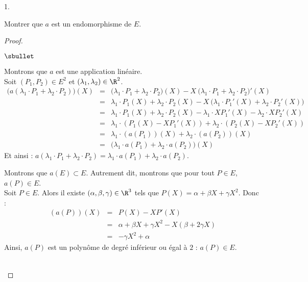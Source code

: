 \begin{noliste}{1.}
  \setlength{\itemsep}{2mm}
\item Montrer que $a$ est un endomorphisme de $E$.
  
  \begin{proof}~
    \begin{noliste}{$\sbullet$}
    \item Montrons que $a$ est une application linéaire.\\
      Soit $(P_1,P_2)\in E^2$ et $(\lambda_1,\lambda_2)\in\R^2$.
      \[
      \begin{array}{rcl}
        \big(a(\lambda_1 \cdot P_1+ \lambda_2 \cdot P_2)\big)(X) & =
        & \big(\lambda_1 \cdot P_1+\lambda_2 \cdot P_2\big)(X) -
        X \ \big(\lambda_1 \cdot P_1+\lambda_2 \cdot P_2 \big)'(X)
        \\[.2cm]
        & = & \lambda_1 \cdot P_1(X) + \lambda_2 \cdot P_2(X)
        -X \ \big(\lambda_1 \cdot P_1'(X) + \lambda_2 \cdot P_2'(X)\big)
        \\[.2cm] 
        & = & \lambda_1 \cdot P_1(X)+\lambda_2 \cdot P_2(X)-\lambda_1 \cdot 
        XP_1'(X) - \lambda_2 \cdot X 
        P_2'(X)
        \\[.2cm]
        & = & \lambda_1 \cdot (P_1(X)-XP_1'(X))+\lambda_2 \cdot(P_2(X)-XP_2'(X))
        \\[.2cm]
        & = & \lambda_1 \cdot (a(P_1))(X)+ \lambda_2 \cdot (a(P_2))(X)
        \\[.2cm]
        & = & \big(\lambda_1 \cdot a(P_1)+ \lambda_2 \cdot a(P_2) \big)(X)
      \end{array}
      \]
      Et ainsi : $a(\lambda_1 \cdot P_1+ \lambda_2 \cdot P_2) =
      \lambda_1 \cdot a(P_1)+ \lambda_2 \cdot a(P_2)$.
      
    \item Montrons que $a(E)\subset E$. Autrement dit, montrons que
      pour
      tout $P\in E$, $a(P)\in E$.\\
      Soit $P\in E$. Alors il existe $(\alpha,\beta,\gamma)\in\R^3$
      tels que $P(X)=\alpha+\beta X+\gamma X^2$. Donc :
      \[
      \begin{array}{rcl}
        (a(P))(X) & = & P(X)-XP'(X)
        \\[.2cm]
        & = & \alpha +\beta X+\gamma X^2 -X(\beta +2\gamma X)
        \\[.2cm]
        & = & -\gamma X^2 + \alpha
      \end{array}
      \]
      Ainsi, $a(P)$ est un polynôme de degré inférieur ou égal à $2$ :
      $a(P)\in E$.
    \end{noliste}
    ~\\[-1.2cm]
  \end{proof}



\end{noliste}
